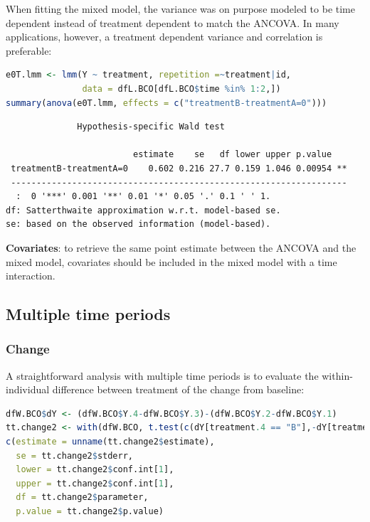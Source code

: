 \documentclass[12pt]{article}
\newcommand\Warning[1][3ex]{%
\renewcommand\stacktype{L}%
\scaleto{\stackon[1.3pt]{\color{red}$\triangle$}{\tiny\bfseries !}}{#1}%
\xspace
}
\begin{document}
\Warning When fitting the mixed model, the variance was on purpose
modeled to be time dependent instead of treatment dependent to match
the ANCOVA. In many applications, however, a treatment dependent
variance and correlation is preferable:
\begin{lstlisting}[language=r,numbers=none]
e0T.lmm <- lmm(Y ~ treatment, repetition =~treatment|id,
               data = dfL.BCO[dfL.BCO$time %in% 1:2,])
summary(anova(e0T.lmm, effects = c("treatmentB-treatmentA=0")))
\end{lstlisting}

\label{}
\begin{verbatim}
              Hypothesis-specific Wald test 

                         estimate    se   df lower upper p.value   
 treatmentB-treatmentA=0    0.602 0.216 27.7 0.159 1.046 0.00954 **
 ------------------------------------------------------------------ 
  :  0 '***' 0.001 '**' 0.01 '*' 0.05 '.' 0.1 ' ' 1.
df: Satterthwaite approximation w.r.t. model-based se. 
se: based on the observed information (model-based).
\end{verbatim}


\textbf{Covariates}: to retrieve the same point estimate between the ANCOVA
and the mixed model, covariates should be included in the mixed model
with a time interaction.

\clearpage
\subsection{Multiple time periods}
\label{sec:org92ebccc}

\subsubsection{Change}
\label{sec:orge8f267f}

A straightforward analysis with multiple time periods is to evaluate 
the within-individual difference between treatment of the change from baseline:
\begin{lstlisting}[language=r,numbers=none]
dfW.BCO$dY <- (dfW.BCO$Y.4-dfW.BCO$Y.3)-(dfW.BCO$Y.2-dfW.BCO$Y.1)
tt.change2 <- with(dfW.BCO, t.test(c(dY[treatment.4 == "B"],-dY[treatment.4 == "A"])))
c(estimate = unname(tt.change2$estimate),
  se = tt.change2$stderr,
  lower = tt.change2$conf.int[1],
  upper = tt.change2$conf.int[1],
  df = tt.change2$parameter,
  p.value = tt.change2$p.value)
\end{lstlisting}
\end{document}
